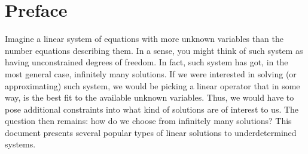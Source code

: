 \documentclass[10pt,twocolumn]{article}
\begin{document}

\setlength{\parindent}{0cm}

\vspace{10mm}

\setlength{\parindent}{0cm}

\fontsize{14}{10}\selectfont {Kamila Zdybał}

\vspace{2mm}

\fontsize{8}{10}

\fontsize{8}{10}

\vspace{2mm}



\section*{Preface}

Imagine a linear system of equations with more unknown variables than the number equations describing them. In a sense, you might think of such system as having unconstrained degrees of freedom. In fact, such system has got, in the most general case, infinitely many solutions. If we were interested in solving (or approximating) such system, we would be picking a linear operator that in some way, is the best fit to the available unknown variables. Thus, we would have to pose additional constraints into what kind of solutions are of interest to us. The question then remains: how do we choose from infinitely many solutions? This document presents several popular types of linear solutions to underdetermined systems.
\end{document}
